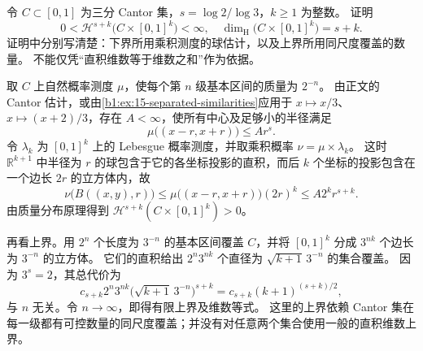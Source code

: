 \begin{optionalexercise}\label{b1:ex:15-cantor-product}
令 \(C\subset[0,1]\) 为三分 Cantor 集，\(s=\log2/\log3\)，\(k\ge1\) 为整数。
证明
\[
 0<\mathcal H^{s+k}\bigl(C\times[0,1]^k\bigr)<\infty,
 \quad
 \dim_{\mathrm H}\bigl(C\times[0,1]^k\bigr)=s+k.
\]
证明中分别写清楚：下界所用乘积测度的球估计，以及上界所用同尺度覆盖的数量。
不能仅凭“直积维数等于维数之和”作为依据。
\end{optionalexercise}
\begin{solution}
取 \(C\) 上自然概率测度 \(\mu\)，使每个第 \(n\) 级基本区间的质量为 \(2^{-n}\)。
由正文的 Cantor 估计，或由\cref{b1:ex:15-separated-similarities}应用于 \(x\mapsto x/3\)、\(x\mapsto(x+2)/3\)，存在 \(A<\infty\)，使所有中心及足够小的半径满足
\[
 \mu\bigl((x-r,x+r)\bigr)\le Ar^s.
\]
令 \(\lambda_k\) 为 \([0,1]^k\) 上的 Lebesgue 概率测度，并取乘积概率 \(\nu=\mu\times\lambda_k\)。
这时 \(\mathbb R^{k+1}\) 中半径为 \(r\) 的球包含于它的各坐标投影的直积，而后 \(k\) 个坐标的投影包含在一个边长 \(2r\) 的立方体内，故
\[
 \nu\bigl(B((x,y),r)\bigr)
 \le\mu\bigl((x-r,x+r)\bigr)(2r)^k
 \le A2^kr^{s+k}.
\]
由质量分布原理得到 \(\mathcal H^{s+k}(C\times[0,1]^k)>0\)。

再看上界。用 \(2^n\) 个长度为 \(3^{-n}\) 的基本区间覆盖 \(C\)，并将 \([0,1]^k\) 分成 \(3^{nk}\) 个边长为 \(3^{-n}\) 的立方体。
它们的直积给出 \(2^n3^{nk}\) 个直径为 \(\sqrt{k+1}\,3^{-n}\) 的集合覆盖。
因为 \(3^s=2\)，其总代价为
\[
 c_{s+k}2^n3^{nk}
 \bigl(\sqrt{k+1}\,3^{-n}\bigr)^{s+k}
 =c_{s+k}(k+1)^{(s+k)/2},
\]
与 \(n\) 无关。令 \(n\to\infty\)，即得有限上界及维数等式。
这里的上界依赖 Cantor 集在每一级都有可控数量的同尺度覆盖；并没有对任意两个集合使用一般的直积维数上界。
\end{solution}
